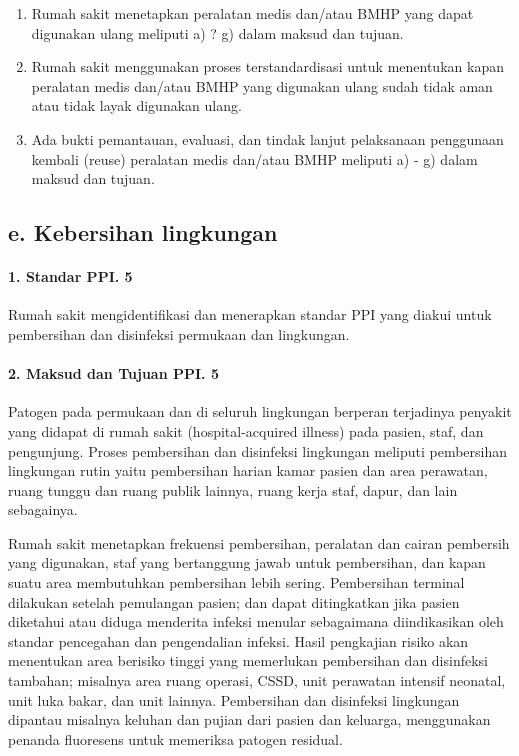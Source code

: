 \documentclass[
]{book}
\providecommand{\tightlist}{%
  \setlength{\itemsep}{0pt}\setlength{\parskip}{0pt}}
\begin{document}
\begin{enumerate}
\def\labelenumi{\alph{enumi}.}
\tightlist
\item
  Rumah sakit menetapkan peralatan medis dan/atau BMHP yang dapat digunakan ulang meliputi a) ? g) dalam maksud dan tujuan.
\item
  Rumah sakit menggunakan proses terstandardisasi untuk menentukan kapan peralatan medis dan/atau BMHP yang digunakan ulang sudah tidak aman atau tidak layak digunakan ulang.
\item
  Ada bukti pemantauan, evaluasi, dan tindak lanjut pelaksanaan penggunaan kembali (reuse) peralatan medis dan/atau BMHP meliputi a) - g) dalam maksud dan tujuan.
\end{enumerate}

\hypertarget{e.-kebersihan-lingkungan}{%
\subsection*{e. Kebersihan lingkungan}\label{e.-kebersihan-lingkungan}}

\hypertarget{standar-ppi.-5}{%
\paragraph*{1. Standar PPI. 5}\label{standar-ppi.-5}}

Rumah sakit mengidentifikasi dan menerapkan standar PPI yang diakui untuk pembersihan dan disinfeksi permukaan dan lingkungan.

\hypertarget{maksud-dan-tujuan-ppi.-5}{%
\paragraph*{2. Maksud dan Tujuan PPI. 5}\label{maksud-dan-tujuan-ppi.-5}}

Patogen pada permukaan dan di seluruh lingkungan berperan terjadinya penyakit yang didapat di rumah sakit (hospital-acquired illness) pada pasien, staf, dan pengunjung. Proses pembersihan dan disinfeksi lingkungan meliputi pembersihan lingkungan rutin yaitu pembersihan harian kamar pasien dan area perawatan, ruang tunggu dan ruang publik lainnya, ruang kerja staf, dapur, dan lain sebagainya.

Rumah sakit menetapkan frekuensi pembersihan, peralatan dan cairan pembersih yang digunakan, staf yang bertanggung jawab untuk pembersihan, dan kapan suatu area membutuhkan pembersihan lebih sering. Pembersihan terminal dilakukan setelah pemulangan pasien; dan dapat ditingkatkan jika pasien diketahui atau diduga menderita infeksi menular sebagaimana diindikasikan oleh standar pencegahan dan pengendalian infeksi. Hasil pengkajian risiko akan menentukan area berisiko tinggi yang memerlukan pembersihan dan disinfeksi tambahan; misalnya area ruang operasi, CSSD, unit perawatan intensif neonatal, unit luka bakar, dan unit lainnya. Pembersihan dan disinfeksi lingkungan dipantau misalnya keluhan dan pujian dari pasien dan keluarga, menggunakan penanda fluoresens untuk memeriksa patogen residual.
\end{document}
